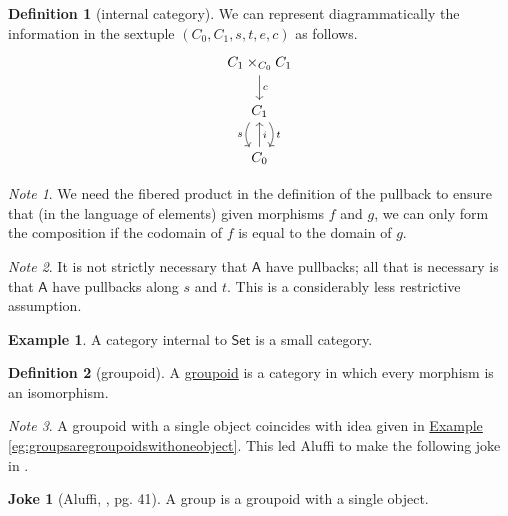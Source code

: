 \documentclass[a4paper]{report}
\newcommand{\defn}[1]{\ul{#1}}
\theoremstyle{definition}
\newtheorem{definition}{Definition}[section]
\newtheorem{example}{Example}[section]
\newtheorem{joke}{Joke}[section]
\theoremstyle{plain}
\theoremstyle{remark}
\newtheorem{note}{Note}[section]
\begin{document}
\begin{definition}[internal category]
  We can represent diagrammatically the information in the sextuple $(C_{0}, C_{1}, s, t, e, c)$ as follows.
  \begin{equation*}
    \begin{tikzcd}
      C_{1} \times_{C_{0}} C_{1}
      \arrow[d, "c"]
      \\
      C_{1}
      \arrow[d, shift left, bend left, "t"]
      \arrow[d, shift right, bend right, swap, "s"]
      \\
      C_{0}
      \arrow[u, swap, "i"]
    \end{tikzcd}
  \end{equation*}
\end{definition}

\begin{note}
  We need the fibered product in the definition of the pullback to ensure that (in the language of elements) given morphisms $f$ and $g$, we can only form the composition if the codomain of $f$ is equal to the domain of $g$.
\end{note}

\begin{note}
  \label{note:internalcategoriesdontneedallpullbacks}
  It is not strictly necessary that $\mathsf{A}$ have pullbacks; all that is necessary is that $\mathsf{A}$ have pullbacks along $s$ and $t$. This is a considerably less restrictive assumption.
\end{note}

\begin{example}
  A category internal to $\mathsf{Set}$ is a small category.
\end{example}

\begin{definition}[groupoid]
  \label{def:groupoid}
  A \defn{groupoid} is a category in which every morphism is an isomorphism.
\end{definition}

\begin{note}
  A groupoid with a single object coincides with idea given in \hyperref[eg:groupsaregroupoidswithoneobject]{Example \ref*{eg:groupsaregroupoidswithoneobject}}. This led Aluffi to make the following joke in \cite{aluffi-algebra-chapter-0}.
\end{note}

\begin{joke}[Aluffi, \cite{aluffi-algebra-chapter-0}, pg. 41]
  A group is a groupoid with a single object.
\end{joke}
\end{document}
